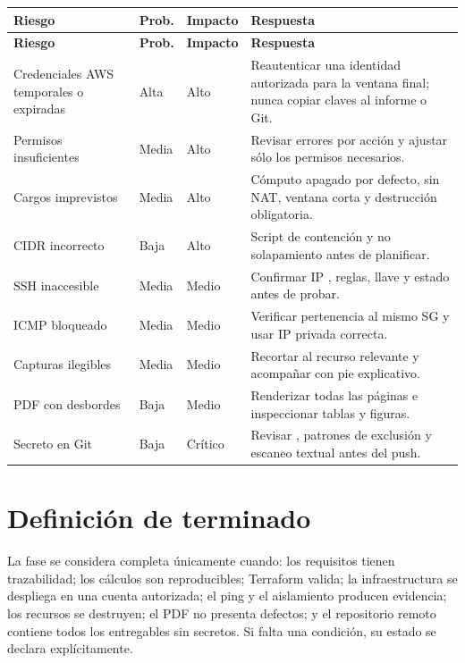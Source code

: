\begin{longtable}{p{3.7cm}C{1.6cm}C{1.6cm}p{6.2cm}}
\toprule
\textbf{Riesgo} & \textbf{Prob.} & \textbf{Impacto} & \textbf{Respuesta} \\
\midrule
\endfirsthead
\toprule
\textbf{Riesgo} & \textbf{Prob.} & \textbf{Impacto} & \textbf{Respuesta} \\
\midrule
\endhead
Credenciales AWS temporales o expiradas & Alta & Alto & Reautenticar una identidad autorizada para la ventana final; nunca copiar claves al informe o Git. \\
Permisos insuficientes & Media & Alto & Revisar errores por acción y ajustar sólo los permisos necesarios. \\
Cargos imprevistos & Media & Alto & Cómputo apagado por defecto, sin NAT, ventana corta y destrucción obligatoria. \\
CIDR incorrecto & Baja & Alto & Script de contención y no solapamiento antes de planificar. \\
SSH inaccesible & Media & Medio & Confirmar IP , reglas, llave y estado antes de probar. \\
ICMP bloqueado & Media & Medio & Verificar pertenencia al mismo SG y usar IP privada correcta. \\
Capturas ilegibles & Media & Medio & Recortar al recurso relevante y acompañar con pie explicativo. \\
PDF con desbordes & Baja & Medio & Renderizar todas las páginas e inspeccionar tablas y figuras. \\
Secreto en Git & Baja & Crítico & Revisar , patrones de exclusión y escaneo textual antes del push. \\
\bottomrule
\end{longtable}

\section{Definición de terminado}

La fase se considera completa únicamente cuando: los requisitos tienen trazabilidad; los cálculos son reproducibles; Terraform valida; la infraestructura se despliega en una cuenta autorizada; el ping y el aislamiento producen evidencia; los recursos se destruyen; el PDF no presenta defectos; y el repositorio remoto contiene todos los entregables sin secretos. Si falta una condición, su estado se declara explícitamente.
